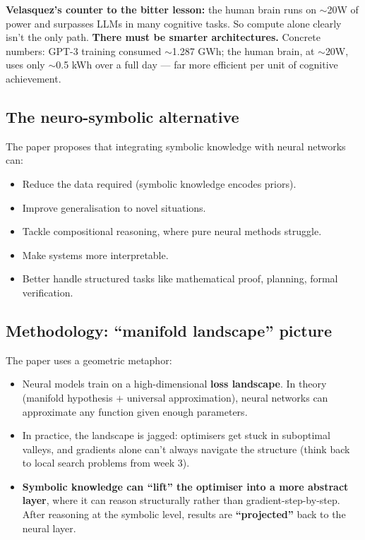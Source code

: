 \documentclass[11pt, a4paper]{article}
\begin{document}
\textbf{Velasquez's counter to the bitter lesson:} the human brain runs on $\sim$20W of power and surpasses LLMs in many cognitive tasks. So compute alone clearly isn't the only path. \textbf{There must be smarter architectures.} Concrete numbers: GPT-3 training consumed $\sim$1.287 GWh; the human brain, at $\sim$20W, uses only $\sim$0.5 kWh over a full day --- far more efficient per unit of cognitive achievement.

\subsection{The neuro-symbolic alternative}

The paper proposes that integrating symbolic knowledge with neural networks can:
\begin{itemize}
  \item Reduce the data required (symbolic knowledge encodes priors).
  \item Improve generalisation to novel situations.
  \item Tackle compositional reasoning, where pure neural methods struggle.
  \item Make systems more interpretable.
  \item Better handle structured tasks like mathematical proof, planning, formal verification.
\end{itemize}

\subsection{Methodology: ``manifold landscape'' picture}

The paper uses a geometric metaphor:
\begin{itemize}
  \item Neural models train on a high-dimensional \textbf{loss landscape}. In theory (manifold hypothesis $+$ universal approximation), neural networks can approximate any function given enough parameters.
  \item In practice, the landscape is jagged: optimisers get stuck in suboptimal valleys, and gradients alone can't always navigate the structure (think back to local search problems from week 3).
  \item \textbf{Symbolic knowledge can ``lift'' the optimiser into a more abstract layer}, where it can reason structurally rather than gradient-step-by-step. After reasoning at the symbolic level, results are \textbf{``projected''} back to the neural layer.
\end{itemize}
\end{document}
